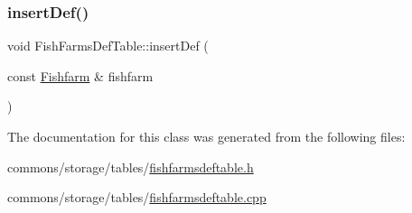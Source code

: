 \subsubsection{\texorpdfstring{insertDef()}{insertDef()}}
{\footnotesize\ttfamily void Fish\+Farms\+Def\+Table\+::insert\+Def (\begin{DoxyParamCaption}\item[{const \mbox{\hyperlink{class_fishfarm}{Fishfarm}} \&}]{fishfarm }\end{DoxyParamCaption})}



The documentation for this class was generated from the following files\+:\begin{DoxyCompactItemize}
\item 
commons/storage/tables/\mbox{\hyperlink{fishfarmsdeftable_8h}{fishfarmsdeftable.\+h}}\item 
commons/storage/tables/\mbox{\hyperlink{fishfarmsdeftable_8cpp}{fishfarmsdeftable.\+cpp}}\end{DoxyCompactItemize}
